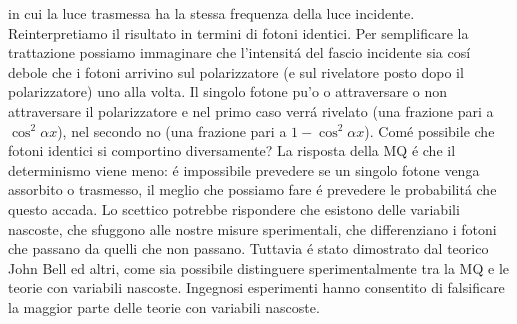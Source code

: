 \documentclass[a4paper]{article}
\numberwithin{equation}{section}
\begin{document}
\begin{enumerate}
in cui la luce trasmessa ha la stessa frequenza della luce incidente. Reinterpretiamo il risultato in termini di fotoni identici. Per semplificare la trattazione possiamo immaginare che l'intensit\'a del fascio incidente sia cos\'i debole che i fotoni arrivino sul polarizzatore (e sul rivelatore posto dopo il polarizzatore) uno alla volta. Il singolo fotone pu'o o attraversare o non attraversare il polarizzatore e nel primo caso verr\'a rivelato (una frazione pari a $\cos^2 \alpha x$), nel secondo no (una frazione pari a $1 - \cos^2 \alpha x$). Com\'e possibile che fotoni identici si comportino diversamente? La risposta della MQ \'e che il determinismo viene meno: \'e impossibile prevedere se un singolo fotone venga assorbito o trasmesso, il meglio che possiamo fare \'e prevedere le probabilit\'a che questo accada. Lo scettico potrebbe rispondere che esistono delle variabili nascoste, che sfuggono alle nostre misure sperimentali, che differenziano i fotoni che passano da quelli che non passano. Tuttavia \'e stato dimostrato dal teorico John Bell ed altri, come sia possibile distinguere sperimentalmente tra la MQ e le teorie con variabili nascoste. Ingegnosi esperimenti hanno consentito di falsificare la maggior parte delle teorie con variabili nascoste.
\end{enumerate}

\newpage



\newpage


\end{document}
